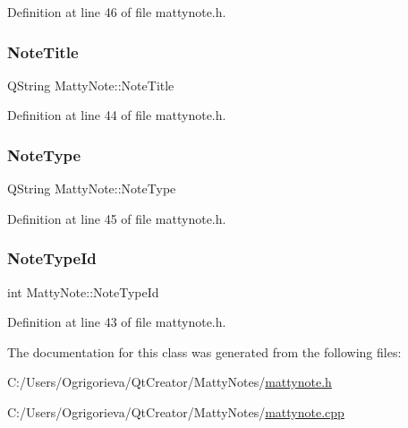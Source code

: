 Definition at line 46 of file mattynote.\+h.

\hypertarget{classMattyNote_a185f1f13eeb93acb237b9db7b4c94229}{}\label{classMattyNote_a185f1f13eeb93acb237b9db7b4c94229} 
\subsubsection{\texorpdfstring{Note\+Title}{NoteTitle}}
{\footnotesize\ttfamily Q\+String Matty\+Note\+::\+Note\+Title\hspace{0.3cm}{\ttfamily [private]}}



Definition at line 44 of file mattynote.\+h.

\hypertarget{classMattyNote_a0b45b382884fac5b651ab1ce155a2c13}{}\label{classMattyNote_a0b45b382884fac5b651ab1ce155a2c13} 
\subsubsection{\texorpdfstring{Note\+Type}{NoteType}}
{\footnotesize\ttfamily Q\+String Matty\+Note\+::\+Note\+Type\hspace{0.3cm}{\ttfamily [private]}}



Definition at line 45 of file mattynote.\+h.

\hypertarget{classMattyNote_ad116cdf301951c8c93ee2a81a0df8647}{}\label{classMattyNote_ad116cdf301951c8c93ee2a81a0df8647} 
\subsubsection{\texorpdfstring{Note\+Type\+Id}{NoteTypeId}}
{\footnotesize\ttfamily int Matty\+Note\+::\+Note\+Type\+Id\hspace{0.3cm}{\ttfamily [private]}}



Definition at line 43 of file mattynote.\+h.



The documentation for this class was generated from the following files\+:\begin{DoxyCompactItemize}
\item 
C\+:/\+Users/\+Ogrigorieva/\+Qt\+Creator/\+Matty\+Notes/\hyperlink{mattynote_8h}{mattynote.\+h}\item 
C\+:/\+Users/\+Ogrigorieva/\+Qt\+Creator/\+Matty\+Notes/\hyperlink{mattynote_8cpp}{mattynote.\+cpp}\end{DoxyCompactItemize}
